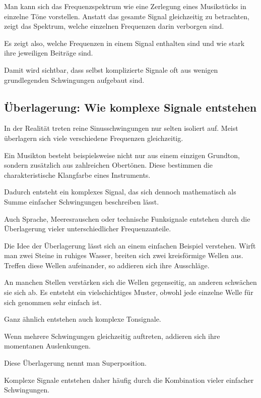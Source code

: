 Man kann sich das Frequenzspektrum
wie eine Zerlegung eines Musikstücks in einzelne Töne vorstellen.
Anstatt das gesamte Signal gleichzeitig zu betrachten,
zeigt das Spektrum,
welche einzelnen Frequenzen darin verborgen sind.

Es zeigt also,
welche Frequenzen in einem Signal enthalten sind
und wie stark ihre jeweiligen Beiträge sind.

Damit wird sichtbar,
dass selbst komplizierte Signale oft aus wenigen grundlegenden Schwingungen aufgebaut sind.

\subsection{Überlagerung: Wie komplexe Signale entstehen}

In der Realität treten reine Sinusschwingungen nur selten isoliert auf.
Meist überlagern sich viele verschiedene Frequenzen gleichzeitig.

Ein Musikton besteht beispielsweise nicht nur aus einem einzigen Grundton,
sondern zusätzlich aus zahlreichen Obertönen.
Diese bestimmen die charakteristische Klangfarbe eines Instruments.

Dadurch entsteht ein komplexes Signal,
das sich dennoch mathematisch als Summe einfacher Schwingungen beschreiben lässt.

Auch Sprache,
Meeresrauschen
oder technische Funksignale entstehen
durch die Überlagerung vieler unterschiedlicher Frequenzanteile.

\medskip

Die Idee der Überlagerung lässt sich an einem einfachen Beispiel verstehen.
Wirft man zwei Steine in ruhiges Wasser,
breiten sich zwei kreisförmige Wellen aus.
Treffen diese Wellen aufeinander,
so addieren sich ihre Ausschläge.

An manchen Stellen verstärken sich die Wellen gegenseitig,
an anderen schwächen sie sich ab.
Es entsteht ein vielschichtiges Muster,
obwohl jede einzelne Welle für sich genommen sehr einfach ist.

Ganz ähnlich entstehen auch komplexe Tonsignale.

\begin{DidacticBox}
	\small
	\label{box:fourier-ueberlagerung-wellen}
	Wenn mehrere Schwingungen gleichzeitig auftreten,
	addieren sich ihre momentanen Auslenkungen.
	
	Diese Überlagerung nennt man Superposition.
	
	Komplexe Signale entstehen daher häufig
	durch die Kombination vieler einfacher Schwingungen.
\end{DidacticBox}

